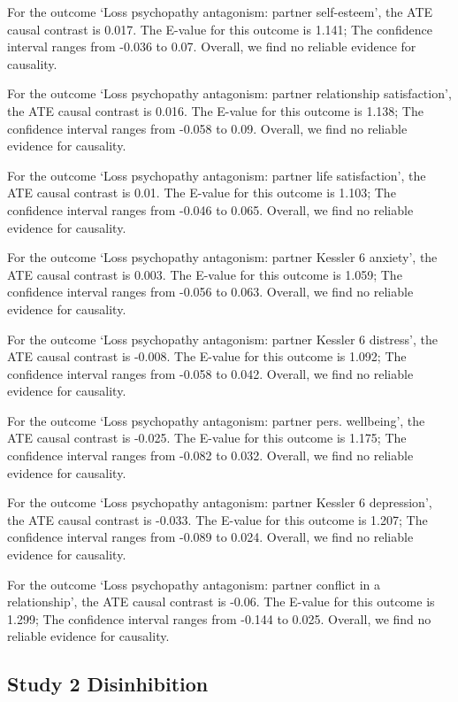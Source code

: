 \documentclass[
  singlecolumn]{article}
\begin{document}
For the outcome `Loss psychopathy antagonism: partner self-esteem', the
ATE causal contrast is 0.017. The E-value for this outcome is 1.141; The
confidence interval ranges from -0.036 to 0.07. Overall, we find no
reliable evidence for causality.

For the outcome `Loss psychopathy antagonism: partner relationship
satisfaction', the ATE causal contrast is 0.016. The E-value for this
outcome is 1.138; The confidence interval ranges from -0.058 to 0.09.
Overall, we find no reliable evidence for causality.

For the outcome `Loss psychopathy antagonism: partner life
satisfaction', the ATE causal contrast is 0.01. The E-value for this
outcome is 1.103; The confidence interval ranges from -0.046 to 0.065.
Overall, we find no reliable evidence for causality.

For the outcome `Loss psychopathy antagonism: partner Kessler 6
anxiety', the ATE causal contrast is 0.003. The E-value for this outcome
is 1.059; The confidence interval ranges from -0.056 to 0.063. Overall,
we find no reliable evidence for causality.

For the outcome `Loss psychopathy antagonism: partner Kessler 6
distress', the ATE causal contrast is -0.008. The E-value for this
outcome is 1.092; The confidence interval ranges from -0.058 to 0.042.
Overall, we find no reliable evidence for causality.

For the outcome `Loss psychopathy antagonism: partner pers. wellbeing',
the ATE causal contrast is -0.025. The E-value for this outcome is
1.175; The confidence interval ranges from -0.082 to 0.032. Overall, we
find no reliable evidence for causality.

For the outcome `Loss psychopathy antagonism: partner Kessler 6
depression', the ATE causal contrast is -0.033. The E-value for this
outcome is 1.207; The confidence interval ranges from -0.089 to 0.024.
Overall, we find no reliable evidence for causality.

For the outcome `Loss psychopathy antagonism: partner conflict in a
relationship', the ATE causal contrast is -0.06. The E-value for this
outcome is 1.299; The confidence interval ranges from -0.144 to 0.025.
Overall, we find no reliable evidence for causality.

\subsection{Study 2 Disinhibition}\label{study-2-disinhibition}
\end{document}
